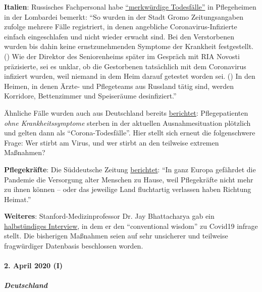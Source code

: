 \textbf{Italien}: Russisches Fachpersonal habe
\href{https://de.sputniknews.com/panorama/20200402326767475-fachpersonal-todesfaelle-lombardei-zeitung/}{``merkwürdige
Todesfälle''} in Pflegeheimen in der Lombardei bemerkt: ``So wurden in
der Stadt Gromo Zeitungsangaben zufolge mehrere Fälle registriert, in
denen angebliche Coronavirus-Infizierte einfach eingeschlafen und nicht
wieder erwacht sind. Bei den Verstorbenen wurden bis dahin keine
ernstzunehmenden Symptome der Krankheit festgestellt. () Wie der
Direktor des Seniorenheims später im Gespräch mit RIA Novosti
präzisierte, sei es unklar, ob die Gestorbenen tatsächlich mit dem
Coronavirus infiziert wurden, weil niemand in dem Heim darauf getestet
worden sei. () In den Heimen, in denen Ärzte- und Pflegeteams aus
Russland tätig sind, werden Korridore, Bettenzimmer und Speiseräume
desinfiziert.''

Ähnliche Fälle wurden auch aus Deutschland bereits
\href{https://web.archive.org/web/20200330082928/https://www.sueddeutsche.de/panorama/coronavirus-news-deutschland-wolfsburg-laschet-1.4828033}{berichtet}:
Pflegepatienten \emph{ohne Krank­heits­symptome} sterben in der
aktuellen Ausnahmesituation plötzlich und gelten dann als
``Corona-Todesfälle''. Hier stellt sich erneut die folgenschwere Frage:
Wer stirbt am Virus, und wer stirbt an den teilweise extremen Maßnahmen?

\textbf{Pflegekräfte}: Die Süddeutsche Zeitung
\href{https://www.sueddeutsche.de/politik/coronavirus-pflegekraefte-ausland-1.4866124}{berichtet}:
``In ganz Europa gefährdet die Pandemie die Versorgung alter Menschen zu
Hause, weil Pflegekräfte nicht mehr zu ihnen können -- oder das
jeweilige Land fluchtartig verlassen haben Richtung Heimat.''

\textbf{Weiteres}: Stanford-Medizinprofessor Dr. Jay Bhattacharya gab
ein \href{https://www.youtube.com/watch?v=-UO3Wd5urg0}{halbstündiges
Interview}, in dem er den ``conventional wisdom'' zu Covid19 infrage
stellt. Die bisherigen Maßnahmen seien auf sehr unsicherer und teilweise
fragwürdiger Datenbasis beschlossen worden.

\hypertarget{2-april-2020-i}{%
\paragraph{2. April 2020 (I)}\label{2-april-2020-i}}

\hypertarget{deutschland}{%
\subparagraph{\texorpdfstring{\textbf{Deutschland}}{Deutschland}}\label{deutschland}}

